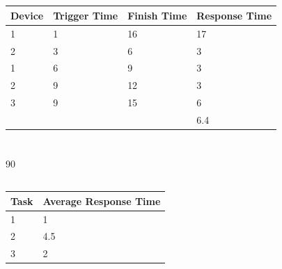 \documentclass[a4paper,12pt]{article}
\begin{document}
\subsection{}
\begin{tabular}{l | l | l | l }
Device & Trigger Time & Finish Time & Response Time \\ \hline
1 & 1 & 16 & 17 \\
2 & 3 & 6 & 3 \\
1 & 6 & 9 & 3 \\
2 & 9 & 12 & 3 \\
3 & 9 & 15 & 6 \\
& & &  6.4
\end{tabular}



\section{}
\subsection{}
\begin{figure}[h!]
\end{figure}

\subsection{}
90

\subsection{}
\begin{tabular}{l l}
Task & Average Response Time \\ \hline
1 & 1 \\
2 & 4.5 \\
3 & 2
\end{tabular}

\subsection{}
\end{document}
